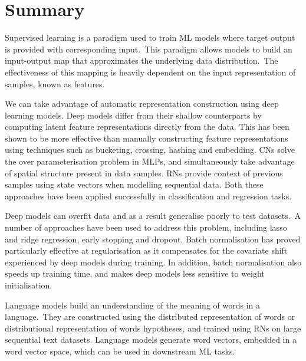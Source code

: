 
\section{Summary}

Supervised learning is a paradigm used to train ML models where target output is provided with corresponding input.\ This paradigm allows models to build an input-output map that approximates the underlying data distribution.\ The effectiveness of this mapping is heavily dependent on the input representation of samples, known as features. \par

\noindent We can take advantage of automatic representation construction using deep learning models. Deep models differ from their shallow counterparts by computing latent feature representations directly from the data. This has been shown to be more effective than manually constructing feature representations using techniques such as bucketing, crossing, hashing and embedding. CNs solve the over parameterisation problem in MLPs, and simultaneously take advantage of spatial structure present in data samples. RNs provide context of previous samples using state vectors when modelling sequential data. Both these approaches have been applied successfully in classification and regression tasks. \par

\noindent Deep models can overfit data and as a result generalise poorly to test datasets.\ A number of approaches have been used to address this problem, including lasso and ridge regression, early stopping and dropout. Batch normalisation has proved particularly effective at regularisation as it compensates for the covariate shift experienced by deep models during training. In addition, batch normalisation also speeds up training time, and makes deep models less sensitive to weight initialisation. \par

\noindent Language models build an understanding of the meaning of words in a language.\ They are constructed using the distributed representation of words or distributional representation of words hypotheses, and trained using RNs on large sequential text datasets. Language models generate word vectors, embedded in a word vector space, which can be used in downstream ML tasks. 

